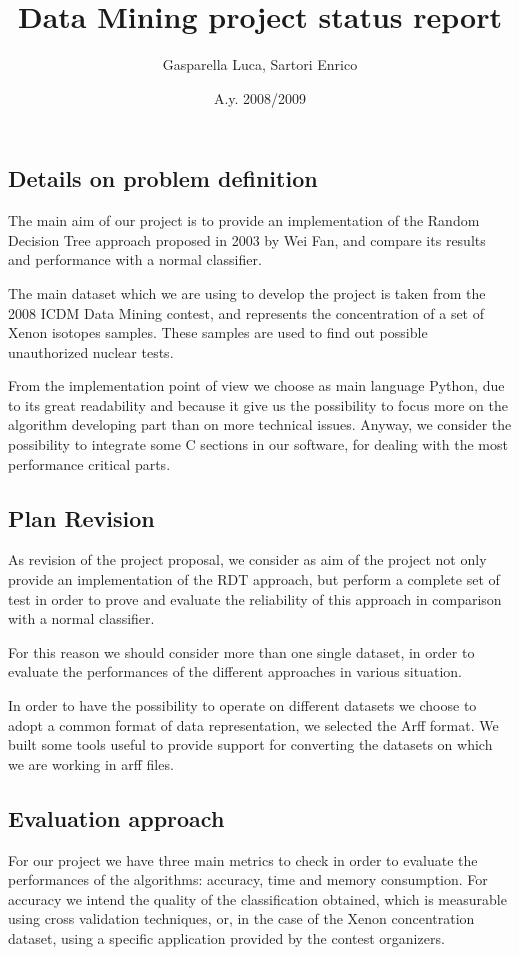 \documentclass[12pt,a4paper]{article}
\title{Data Mining project status report}
\author{Gasparella Luca, Sartori Enrico}
\date{A.y. 2008/2009}
\begin{document}
\maketitle
\subsection*{Details on problem definition}
The main aim of our project is to provide an implementation of the Random
Decision Tree approach proposed in 2003 by Wei Fan, and compare
its results and performance with a normal classifier.

The main dataset which we are using to develop the project is taken from
the 2008 ICDM Data Mining contest, and represents the
concentration of a set of Xenon isotopes samples. These samples are used
to find out possible unauthorized nuclear tests.

From the implementation point of view we choose as main language Python,
due to its great readability and because it give us the possibility to
focus more on the algorithm developing part than on more technical issues.
Anyway, we consider the possibility to integrate some C sections in our
software, for dealing with the most performance critical parts.

\subsection*{Plan Revision}
As revision of the project proposal, we consider as aim of the project not
only provide an implementation of the RDT approach, but perform a complete
set of test in order to prove and evaluate the reliability of this
approach in comparison with a normal classifier.

For this reason we should consider more than one single dataset, in order
to evaluate the performances of the different approaches in various
situation.

In order to have the possibility to operate on different datasets we
choose to adopt a common format of data representation, we selected the
Arff format. We built some tools useful to provide support for converting
the datasets on which we are working in arff files.

\subsection*{Evaluation approach}
For our project we have three main metrics to check in order to evaluate
the performances of the algorithms: accuracy, time and memory consumption.
For accuracy we intend the quality of the classification obtained, which
is measurable using cross validation techniques, or, in the case of the
Xenon concentration dataset, using a specific application provided by the
contest organizers.
\end{document}
